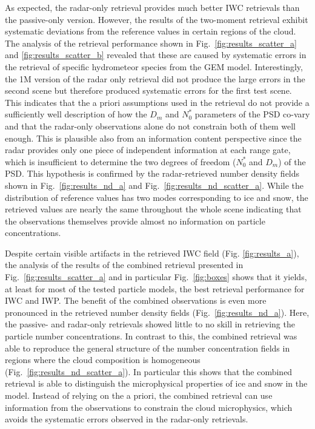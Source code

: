 \documentclass[journal abbreviation, manuscript]{copernicus}
\begin{document}
As expected, the radar-only retrieval provides much better IWC retrievals than
the passive-only version. However, the results of the two-moment retrieval
exhibit systematic deviations from the reference values in certain regions of
the cloud. The analysis of the retrieval performance shown in
Fig.~\ref{fig:results_scatter_a} and \ref{fig:results_scatter_b} revealed that
these are caused by systematic errors in the retrieval of specific hydrometeor
species from the GEM model. Interestingly, the 1M version of the radar only
retrieval did not produce the large errors in the second scene but therefore
produced systematic errors for the first test scene. This indicates that the a
priori assumptions used in the retrieval do not provide a sufficiently well
description of how the $D_m$ and $N_0^*$ parameters of the PSD co-vary and that
the radar-only observations alone do not constrain both of them well enough.
This is plausible also from an information content perspective since the radar
provides only one piece of independent information at each range gate, which is
insufficient to determine the two degrees of freedom ($N_0^*$ and $D_m$) of the
PSD. This hypothesis is  confirmed by the radar-retrieved number density fields shown
in Fig.~\ref{fig:results_nd_a} and Fig.~\ref{fig:results_nd_scatter_a}. While
the distribution of reference values has two modes corresponding to ice and
snow, the retrieved values are nearly the same throughout the whole scene
indicating that the observations themselves provide almost no information on
particle concentrations.

Despite certain visible artifacts in the retrieved IWC field (Fig.
\ref{fig:results_a}), the analysis of the results of the combined retrieval
presented in Fig.~\ref{fig:results_scatter_a} and in particular
Fig.~\ref{fig:boxes} shows that it yields, at least for most of the tested
particle models, the best retrieval performance for IWC and IWP. The benefit of
the combined observations is even more pronounced in the retrieved number
density fields (Fig.~\ref{fig:results_nd_a}). Here, the passive- and radar-only
retrievals showed little to no skill in retrieving the particle number
concentrations. In contrast to this, the combined retrieval was able to
reproduce the general structure of the number concentration fields in regions
where the cloud composition is homogeneous
(Fig.~\ref{fig:results_nd_scatter_a}). In particular this shows that the
combined retrieval is able to distinguish the microphysical properties of ice
and snow in the model. Instead of relying on the a priori, the combined
retrieval can use information from the observations to constrain the cloud
microphysics, which avoids the systematic errors observed in the radar-only
retrievals.
\end{document}
